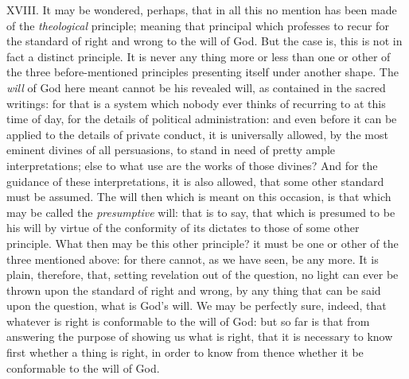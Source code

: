 \documentclass[12pt]{report}
\begin{document}
XVIII. It may be wondered, perhaps, that in all this no mention has been
made of the \emph{theological} principle; meaning that principal which
professes to recur for the standard of right and wrong to the will of
God. But the case is, this is not in fact a distinct principle. It is
never any thing more or less than one or other of the three
before-mentioned principles presenting itself under another shape. The
\emph{will} of God here meant cannot be his revealed will, as contained
in the sacred writings: for that is a system which nobody ever thinks of
recurring to at this time of day, for the details of political
administration: and even before it can be applied to the details of
private conduct, it is universally allowed, by the most eminent divines
of all persuasions, to stand in need of pretty ample interpretations;
else to what use are the works of those divines? And for the guidance of
these interpretations, it is also allowed, that some other standard must
be assumed. The will then which is meant on this occasion, is that which
may be called the \emph{presumptive} will: that is to say, that which is
presumed to be his will by virtue of the conformity of its dictates to
those of some other principle. What then may be this other principle? it
must be one or other of the three mentioned above: for there cannot, as
we have seen, be any more. It is plain, therefore, that, setting
revelation out of the question, no light can ever be thrown upon the
standard of right and wrong, by any thing that can be said upon the
question, what is God's will. We may be perfectly sure, indeed, that
whatever is right is conformable to the will of God: but so far is that
from answering the purpose of showing us what is right, that it is
necessary to know first whether a thing is right, in order to know from
thence whether it be conformable to the will of God.
\end{document}
